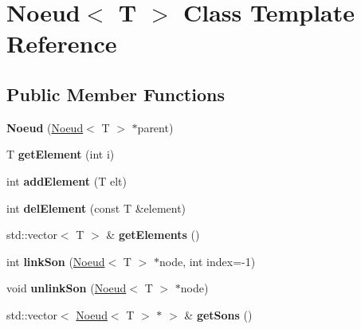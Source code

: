 \hypertarget{classNoeud}{
\section{Noeud$<$ T $>$ Class Template Reference}
\label{classNoeud}
}
\subsection*{Public Member Functions}
\begin{DoxyCompactItemize}
\item 
\hypertarget{classNoeud_a7a68d0e206df13194413328fa431812e}{
{\bfseries Noeud} (\hyperlink{classNoeud}{Noeud}$<$ T $>$ $\ast$parent)}
\label{classNoeud_a7a68d0e206df13194413328fa431812e}

\item 
\hypertarget{classNoeud_a35239304a73f207562c18518dbf1e099}{
T {\bfseries getElement} (int i)}
\label{classNoeud_a35239304a73f207562c18518dbf1e099}

\item 
\hypertarget{classNoeud_accd8d04f9486008c19e632fe7e7ab092}{
int {\bfseries addElement} (T elt)}
\label{classNoeud_accd8d04f9486008c19e632fe7e7ab092}

\item 
\hypertarget{classNoeud_a3dd8653eacafccb54af61b7e10c696b8}{
int {\bfseries delElement} (const T \&element)}
\label{classNoeud_a3dd8653eacafccb54af61b7e10c696b8}

\item 
\hypertarget{classNoeud_a1a212caae417e8c986c7747263781519}{
std::vector$<$ T $>$ \& {\bfseries getElements} ()}
\label{classNoeud_a1a212caae417e8c986c7747263781519}

\item 
\hypertarget{classNoeud_a17b8932e392231d3b8064e53f96f11ee}{
int {\bfseries linkSon} (\hyperlink{classNoeud}{Noeud}$<$ T $>$ $\ast$node, int index=-\/1)}
\label{classNoeud_a17b8932e392231d3b8064e53f96f11ee}

\item 
\hypertarget{classNoeud_a83aecc420674abe5e7eb87be5de777bc}{
void {\bfseries unlinkSon} (\hyperlink{classNoeud}{Noeud}$<$ T $>$ $\ast$node)}
\label{classNoeud_a83aecc420674abe5e7eb87be5de777bc}

\item 
\hypertarget{classNoeud_aa530f295f3e72312e40a97571d40be61}{
std::vector$<$ \hyperlink{classNoeud}{Noeud}$<$ T $>$ $\ast$ $>$ \& {\bfseries getSons} ()}
\label{classNoeud_aa530f295f3e72312e40a97571d40be61}


\end{DoxyCompactItemize}
